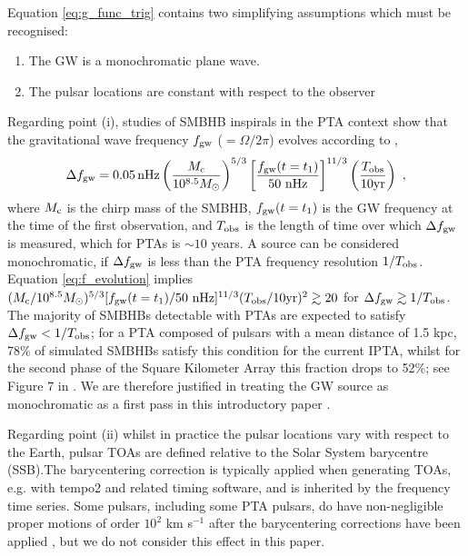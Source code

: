 \documentclass[fleqn,usenatbib,useAMS]{mnras}
\begin{document}
Equation \eqref{eq:g_func_trig} contains two simplifying assumptions which must be recognised:  
\begin{enumerate}
	\item The GW is a monochromatic plane wave.
	\item The pulsar locations are constant with respect to the observer 
\end{enumerate}
Regarding point (i), studies of SMBHB inspirals in the PTA context show that the gravitational wave frequency $f_{\rm gw}$ ($=\Omega / 2 \pi $) evolves according to \citep[e.g.][]{Sesana2010},
\begin{equation}
	\Delta f_{\rm gw} = 0.05 \, \mathrm{nHz}\left(\frac{M_{\rm c}}{10^{8.5} M_{\odot}}\right)^{5 / 3}\left[\frac{f_{\rm gw}(t=t_1)}{50 \mathrm{~nHz}}\right]^{11 / 3}\left(\frac{T_{\mathrm{obs}}}{10 \mathrm{yr}}\right) \ ,
	\label{eq:f_evolution}
\end{equation}
where $M_{\rm c}$ is the chirp mass of the SMBHB, $f_{\rm gw}(t=t_1)$ is the GW frequency at the time of the first observation, and $T_{\rm obs}$ is the length of time over which $\Delta f_{\rm gw}$ is measured, which for PTAs is $\sim 10$ years. A source can be considered monochromatic, if $\Delta f_{\rm gw}$ is less than the PTA frequency resolution $1/T_{\rm obs}$. Equation \eqref{eq:f_evolution} implies $(M_{\rm c}/10^{8.5} M_{\odot})^{5/3} [ f_{\rm gw}(t=t_1) / 50 \mathrm{~nHz}]^{11/3} (T_{\rm obs}/10 \mathrm{yr})^2 \gtrsim 20$ for $\Delta f_{\rm gw} \gtrsim 1/T_{\rm obs}$. The majority of SMBHBs detectable with PTAs are expected to satisfy $\Delta f_{\rm gw} < 1/T_{\rm obs}$; for a PTA composed of pulsars with a mean distance of 1.5 kpc, 78\% of simulated SMBHBs satisfy this condition for the current IPTA, whilst for the second phase of the Square Kilometer Array this fraction drops to 52\%; see Figure 7 in  \cite{Rosado10.1093/mnras/stv1098}. We are therefore justified in treating the GW source as monochromatic as a first pass in this introductory paper \citep{Sesana10,Sesana2010,Ellis2012ApJ}. \newline 


Regarding point (ii) whilst in practice the pulsar locations vary with respect to the Earth, pulsar TOAs are defined relative to the Solar System barycentre (SSB).The barycentering correction is typically applied when generating TOAs, e.g. with {\sc tempo2} \citep{tempo2} and related timing software, and is inherited by the frequency time series. Some pulsars, including some PTA pulsars, do have non-negligible proper motions of order $10^2$ km s$^{-1}$ after the barycentering corrections have been applied \citep[e.g.][]{10.1093/mnras/sty3390}, but we do not consider this effect in this paper. 
\end{document}
